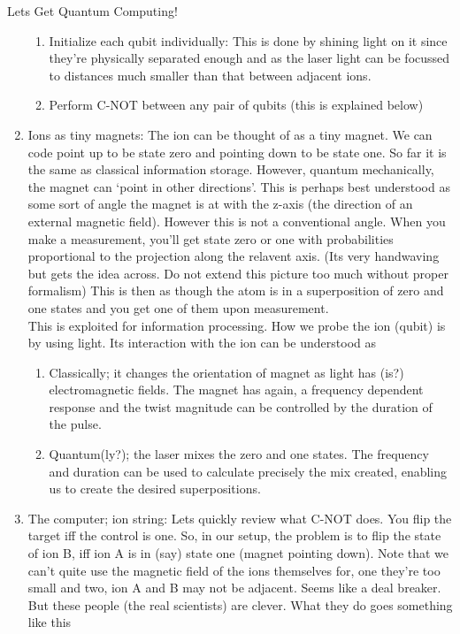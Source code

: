 \documentclass[final,hyperref={pdfpagelabels=false}]{beamer}
\begin{document}
\begin{frame}[t]
\begin{columns}[t]
\begin{column}{.465\textwidth}
\begin{block}{Lets Get Quantum Computing!}
\begin{enumerate}
	\begin{enumerate}
		\item Initialize each qubit individually: This is done by shining light
		on it since they're physically separated enough and as the laser light
		can be focussed to distances much smaller than that between adjacent
		ions.
		\item Perform C-NOT between any pair of qubits (this is explained below)
	\end{enumerate}

	\item Ions as tiny magnets: The ion can be thought of as a tiny magnet.
	We can code point up to be state zero and pointing down to be state
	one. So far it is the same as classical information storage. However,
	quantum mechanically, the magnet can `point in other directions'.
	This is perhaps best understood as some sort of angle the magnet is
	at with the z-axis (the direction of an external magnetic field).
	However this is not a conventional angle. When you make a measurement,
	you'll get state zero or one with probabilities proportional to the
	projection along the relavent axis. (Its very handwaving but gets
	the idea across. Do not extend this picture too much without proper
	formalism) This is then as though the atom is in a superposition of
	zero and one states and you get one of them upon measurement.\\
	This is exploited for information processing. How we probe the ion
	(qubit) is by using light. Its interaction with the ion can be understood
	as

	\begin{enumerate}
		\item Classically; it changes the orientation of magnet as light has (is?)
		electromagnetic fields. The magnet has again, a frequency dependent
		response and the twist magnitude can be controlled by the duration
		of the pulse.
		\item Quantum(ly?); the laser mixes the zero and one states. The frequency
		and duration can be used to calculate precisely the mix created,
		enabling us to create the desired superpositions.
	\end{enumerate}

	\item The computer; ion string: Lets quickly review what C-NOT does. You
	flip the target iff the control is one. So, in our setup, the problem
	is to flip the state of ion B, iff ion A is in (say) state one (magnet
	pointing down). Note that we can't quite use the magnetic field of
	the ions themselves for, one they're too small and two, ion A and
	B may not be adjacent. Seems like a deal breaker. But these people
	(the real scientists) are clever. What they do goes something like this


\end{enumerate}
\end{block}
\end{column}
\end{columns}
\end{frame}
\end{document}
